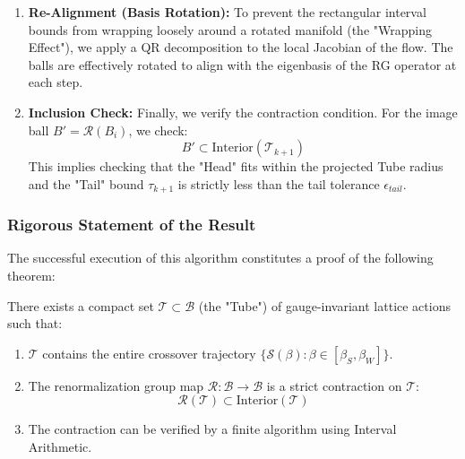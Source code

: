 \begin{enumerate}
    \item \textbf{Re-Alignment (Basis Rotation):} To prevent the rectangular interval bounds from wrapping loosely around a rotated manifold (the "Wrapping Effect"), we apply a QR decomposition to the local Jacobian of the flow. The balls are effectively rotated to align with the eigenbasis of the RG operator at each step.

    \item \textbf{Inclusion Check:} Finally, we verify the contraction condition. For the image ball $B' = \mathcal{R}(B_i)$, we check:
    \[ B' \subset \text{Interior}(\mathcal{T}_{k+1}) \]
    This implies checking that the "Head" fits within the projected Tube radius and the "Tail" bound $\tau_{k+1}$ is strictly less than the tail tolerance $\epsilon_{tail}$.
\end{enumerate}

\subsubsection{Rigorous Statement of the Result}

The successful execution of this algorithm constitutes a proof of the following theorem:

\begin{theorem}
\label{thm:tube_verification_detailed}
There exists a compact set $\mathcal{T} \subset \mathcal{B}$ (the "Tube") of gauge-invariant lattice actions such that:
\begin{enumerate}
    \item $\mathcal{T}$ contains the entire crossover trajectory $\{\mathcal{S}(\beta) : \beta \in [\beta_S, \beta_W]\}$.
    \item The renormalization group map $\mathcal{R}: \mathcal{B} \to \mathcal{B}$ is a strict contraction on $\mathcal{T}$:
    \[ \mathcal{R}(\mathcal{T}) \subset \text{Interior}(\mathcal{T}) \]
    \item The contraction can be verified by a finite algorithm using Interval Arithmetic.
\end{enumerate}
\end{theorem}

